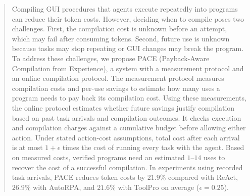 \begin{abstract}
Compiling GUI procedures that agents execute repeatedly into programs can reduce their token costs.
However, deciding when to compile poses two challenges.
First, the compilation cost is unknown before an attempt, which may fail after consuming tokens.
Second, future use is unknown because tasks may stop repeating or GUI changes may break the program.
To address these challenges, we propose PACE (Payback-Aware Compilation from Experience), a system with a measurement protocol and an online compilation protocol.
The measurement protocol measures compilation costs and per-use savings to estimate how many uses a program needs to pay back its compilation cost.
Using these measurements, the online protocol estimates whether future savings justify compilation based on past task arrivals and compilation outcomes.
It checks execution and compilation charges against a cumulative budget before allowing either action.
Under stated action-cost assumptions, total cost after each arrival is at most $1+\epsilon$ times the cost of running every task with the agent.
Based on measured costs, verified programs need an estimated $1$--$14$ uses to recover the cost of a successful compilation.
In experiments using recorded task arrivals, PACE reduces token costs by $21.9\%$ compared with ReAct, $26.9\%$ with AutoRPA, and $21.6\%$ with ToolPro on average ($\epsilon=0.25$).
\end{abstract}
